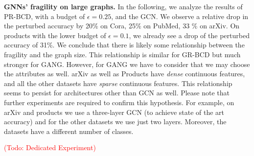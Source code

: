 \documentclass[sigconf,authordraft]{acmart}
\newcommand{\todo}[1]{\textcolor{red}{(Todo: #1)}}
\begin{document}
\textbf{GNNs' fragility on large graphs.} In the following, we analyze the results of PR-BCD, with a budget of \(\epsilon=0.25\), and the GCN. We observe a relative drop in the perturbed accuracy by 20\% on Cora, 25\% on PubMed, 33 \% on arXiv. On products with the lower budget of \(\epsilon=0.1\), we already see a drop of the perturbed accuracy of 31\%. We conclude that there is likely some relationship between the fragility and the graph size. This relationship is similar for GR-BCD but much stronger for GANG. However, for GANG we have to consider that we may choose the attributes as well. arXiv as well as Products have \textit{dense} continuous features, and all the other datasets have \textit{sparse} continuous features. This relationship seems to persist for architectures other than GCN as well. Please note that further experiments are required to confirm this hypothesis. For example, on arXiv and products we use a three-layer GCN (to achieve state of the art accuracy) and for the other datasets we use just two layers. Moreover, the datasets have a different number of classes.

\todo{Dedicated Experiment}

\iffalse
\begin{figure}[t]
  \centering
  \hbox{\hspace{45pt} \resizebox{0.7\linewidth}{!}{}}
  \vspace{-14pt}
  \makebox[\linewidth][c]{
    \(\begin{array}{cc}
      \subfloat[Clean graph]{\resizebox{0.5\linewidth}{!}{}} &
      \subfloat[\(\epsilon=0.01\)]{\resizebox{0.5\linewidth}{!}{}}  \\
      \subfloat[\(\epsilon=0.1\)]{\resizebox{0.5\linewidth}{!}{}} &
      \subfloat[\(\epsilon=0.25\)]{\resizebox{0.5\linewidth}{!}{}}  \\
    \end{array}\)
  }
  \caption{For each of the 500 experiments, we sample 8 classes out of the 40 classes of the arXiv dataset and then take the largest connected component. We argue that the difficulty of a classification task is strongly influenced by the number of classes which is apparent by the lower random chance for more classes. In (a) we see, that there is some variance in the results, but the slope is not significant. For low perturbation budgets (b), we see a clear trend that the large graph is less robust (i.e.\ the  drop in accuracy is stronger for large graphs). Around a budget of \(\epsilon\) the slope becomes insignificant and (d) with a large budget the smaller graphs are less robust. In (b) we observe a correlation of \(\rho_b=0.36\) with a significance of \(\alpha_b=2e-16\) and in (d) \(\rho_b=-0.28\) with a significance of \(\alpha_b=2e-10\) \label{fig:graphsizevsrobustness}}
\end{figure}
\fi
\end{document}
